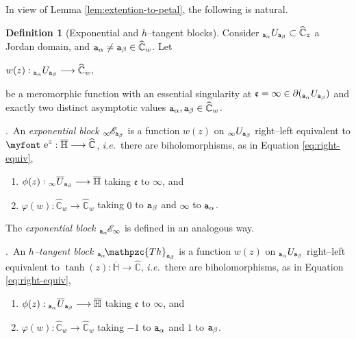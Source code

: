 \documentclass[final,3p,times]{elsarticle}
\newcommand{\CW}{\ensuremath{{\widehat{\mathbb C}}}}
\newcommand{\HH}{\ensuremath{{\mathbb H}}}
\newcommand{\e}{{\text{\myfont e}}}
\newcommand{\ent}[2]{{}_{#1}\hspace{-1pt}\mathscr{E}_{#2}}
\newcommand{\htan}[2]{{}_{#1}\hspace{-2pt}\mathpzc{Th}_{#2}}    %
\newcommand{\dominio}[3]{{}_{#2}{#1}_{#3}}
\theoremstyle{definition}
\newtheorem{definition}[theorem]{Definition}
\begin{document}
In view of Lemma \ref{lem:extention-to-petal}, the following is natural.
%
\begin{definition}[Exponential and $h$--tangent blocks]
\label{def:piezas-elementales}
Consider $\dominio{U}{{\tt a}_\alpha}{{\tt a}_\beta} \subset \CW_z$
a Jordan domain, 
and ${\tt a}_\alpha \neq  {\tt a}_\beta \in \CW_w$.
Let 

\centerline{
$w(z): \dominio{U}{{\tt a}_\alpha}{{\tt a}_\beta} \longrightarrow \CW_w, $
}

\noindent  
be a meromorphic function
with an essential singularity at 
$\mathfrak{e}=\infty\in \partial ( \dominio{U}{{\tt a}_\alpha}{{\tt a}_\beta} )$ 
and exactly two distinct 
asymptotic values ${\tt a}_\alpha, {\tt a}_\beta \in\CW_w$.


.\ 
An \emph{exponential block $\ent{\infty}{{\tt a}_\beta}$ } 
is a function  
$w(z)$ on $\dominio{U}{\infty }{{\tt a}_\beta}$
right--left equivalent to 
$\e^z: \overline{\HH} \longrightarrow \CW$, 
\emph{i.e.}\ there are
biholomorphisms, as in Equation \eqref{eq:right-equiv}, 

\begin{enumerate}[label=\roman*),leftmargin=*]
\item 
$\phi(z):  \dominio{\overline{U}}{\infty }{{\tt a}_\beta}   \longrightarrow \overline{ \HH }$
taking $\mathfrak{e}$ to $\infty$, and

\item 
$\varphi(w):\CW_{w} \longrightarrow \CW_w$ taking 
$0$ to ${\tt a}_\beta$ and 
$\infty$ to ${\tt a}_\alpha $.
\end{enumerate}

\noindent 
The \emph{exponential block $\ent{{\tt a}_\alpha}{\infty}$ } 
is defined in an analogous way.

.\ An \emph{$h$--tangent block 
$\htan{{\tt a}_\alpha }{{\tt a}_\beta }$} is 
a function $w(z)$ on $\dominio{U}{{\tt a}_\alpha }{{\tt a}_\beta }$
right--left equivalent to 
$\tanh (z) : \overline{\HH} \longrightarrow \CW$, 
\emph{i.e.}\ there are
biholomorphisms, as in Equation \eqref{eq:right-equiv},

\begin{enumerate}[label=\roman*),leftmargin=*]
\item 
$\phi(z):  \dominio{\overline{U}}{{\tt a}_\alpha }{{\tt a}_\beta }   \longrightarrow \overline{ \HH }$
taking $\mathfrak{e}$ to $\infty$, and

\item 
$\varphi(w):\CW_{w} \longrightarrow \CW_w$ taking 
$-1$ to ${\tt a}_\alpha $ and 
$1$ to ${\tt a}_\beta  $.
\end{enumerate}

\end{definition}
\end{document}
